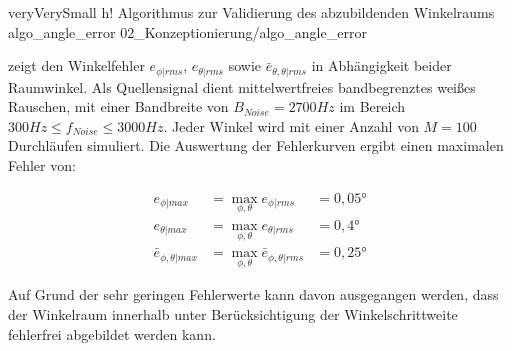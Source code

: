          {veryVerySmall}                 %
         {h!}             %
         {Algorithmus zur Validierung des abzubildenden Winkelraums}                %
         {algo_angle_error}                %
         {02_Konzeptionierung/algo_angle_error}     %





 zeigt den Winkelfehler $e_{\phi | rms}$, $e_{\theta | rms}$ sowie $\bar e_{\theta, \theta | rms}$ in Abhängigkeit beider Raumwinkel. Als Quellensignal dient mittelwertfreies bandbegrenztes weißes Rauschen, mit einer Bandbreite von $B_{Noise} = 2700Hz$ im Bereich $300 Hz \leq f_{Noise} \leq 3000Hz$. Jeder Winkel wird mit einer Anzahl von $M=100$ Durchläufen simuliert. Die Auswertung der Fehlerkurven ergibt einen maximalen Fehler von:

\begin{equation*}
    \begin{array}{lll}
        e_{\phi | max} & = \displaystyle\max_{\phi,\theta}{ e_{\phi | rms}} & = 0,05° \\
        e_{\theta | max} & = \displaystyle\max_{\phi,\theta}{ e_{\theta | rms}} & = 0,4° \\
        \bar e_{\phi, \theta | max} & = \displaystyle\max_{\phi,\theta}{  \bar e_{\phi, \theta | rms}} & = 0,25°
    \end{array}
\end{equation*}

Auf Grund der sehr geringen Fehlerwerte kann davon ausgegangen werden, dass der Winkelraum innerhalb unter Berücksichtigung der Winkelschrittweite fehlerfrei abgebildet werden kann.




